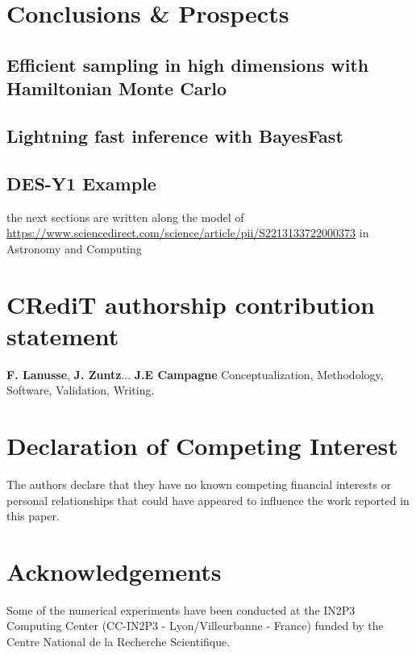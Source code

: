 \documentclass[twocolumn,twocolappendix,nofootinbib]{openjournal}
\begin{document}
\section{Conclusions \& Prospects}
\label{sec-conclusion}


\subsection{Efficient sampling in high dimensions with Hamiltonian Monte Carlo}



\subsection{Lightning fast inference with BayesFast}

%
%
\subsection{DES-Y1 Example}
%


{\color{red} the next sections are written along the model of \url{https://www.sciencedirect.com/science/article/pii/S2213133722000373} in Astronomy and Computing}
\section*{CRediT authorship contribution statement}
\textbf{F. Lanusse}, \textbf{J. Zuntz}...
\textbf{J.E Campagne} Conceptualization, Methodology, Software, Validation, Writing.

\section*{Declaration of Competing Interest}
The authors declare that they have no known competing financial interests or personal relationships that could have appeared to influence the work reported in this paper.

\section*{Acknowledgements}
Some of the numerical experiments have been conducted at the IN2P3 Computing Center (CC-IN2P3 - Lyon/Villeurbanne - France) funded by the Centre National de la Recherche Scientifique.
\end{document}
